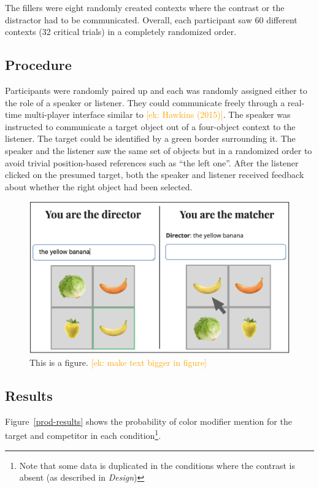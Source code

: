 \documentclass[10pt,letterpaper]{article}
\newcommand{\ek}[1]{\textcolor{Orange}{[ek: #1]}}
\begin{document}
The fillers were eight randomly created contexts where the contrast or the distractor had to be communicated.
Overall, each participant saw 60 different contexts (32 critical trials) in a completely randomized order.


\subsection{Procedure}
Participants were randomly paired up and each was randomly assigned either to the role of a speaker or listener. They could communicate freely through a real-time multi-player interface similar to \ek{Hawkins (2015)}. The speaker was instructed to communicate a target object out of a four-object context to the listener. The target could be identified by a green border surrounding it. The speaker and the listener saw the same set of objects but in a randomized order to avoid trivial position-based references such as ``the left one''. After the listener clicked on the presumed target, both the speaker and listener received feedback about whether the right object had been selected.

\begin{figure}
	\begin{center}
		\includegraphics[width=.475\textwidth]{graphs/prod-design.pdf}
	\end{center}
\caption{This is a figure. \ek{make text bigger in figure}} 
\label{prod-design}
\end{figure}


\subsection{Results}
Figure~\ref{prod-results} shows the probability of color modifier mention for the target and competitor in each condition\footnote{Note that some data is duplicated in the conditions where the contrast is absent (as described in \textit{Design})}. 
\end{document}
